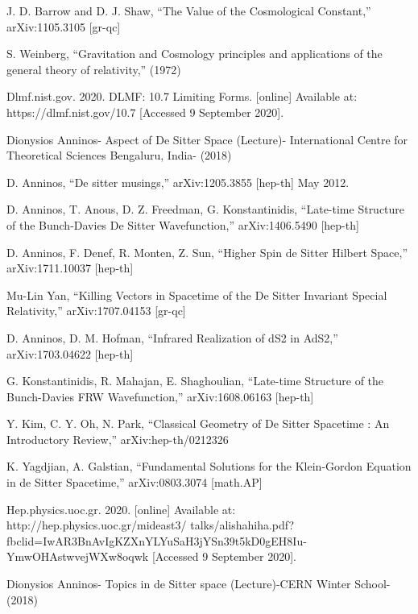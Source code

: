 \documentclass[a4paper,11pt]{article}
\numberwithin{equation}{section}
\numberwithin{figure}{section}
\begin{document}
\begin{large}
\begin{thebibliography}{}
    J. D. Barrow and D. J. Shaw, “The Value of the Cosmological Constant,” arXiv:1105.3105 [gr-qc]
    
    S. Weinberg, “Gravitation and Cosmology principles and applications of the general theory of relativity,” (1972)

    
    Dlmf.nist.gov. 2020. DLMF: 10.7 Limiting Forms. [online] Available at: https://dlmf.nist.gov/10.7 [Accessed 9 September 2020].
    
    Dionysios Anninos- Aspect of De Sitter Space (Lecture)- 
    International Centre for Theoretical Sciences Bengaluru, India- (2018)
    
    D. Anninos, “De sitter musings,” 	arXiv:1205.3855 [hep-th] May 2012.
    
    D. Anninos, T. Anous, D. Z. Freedman, G. Konstantinidis, “Late-time Structure of the Bunch-Davies De Sitter Wavefunction,” arXiv:1406.5490 [hep-th]
    
    D. Anninos, F. Denef, R. Monten, Z. Sun, “Higher Spin de Sitter Hilbert Space,” arXiv:1711.10037 [hep-th]
    
    Mu-Lin Yan, “Killing Vectors in Spacetime of the De Sitter Invariant Special Relativity,” arXiv:1707.04153 [gr-qc]
    
    D. Anninos, D. M. Hofman, “Infrared Realization of dS2 in AdS2,” 	arXiv:1703.04622 [hep-th]
    
    G. Konstantinidis, R. Mahajan, E. Shaghoulian, “Late-time Structure of the Bunch-Davies FRW Wavefunction,” arXiv:1608.06163 [hep-th]
    
    Y. Kim, C. Y. Oh, N. Park, “Classical Geometry of De Sitter Spacetime : An Introductory Review,” 	arXiv:hep-th/0212326
    
    K. Yagdjian, A. Galstian, “Fundamental Solutions for the Klein-Gordon Equation in de Sitter Spacetime,” 	arXiv:0803.3074 [math.AP]
    
    Hep.physics.uoc.gr. 2020. [online] Available at: http://hep.physics.uoc.gr/mideast3/
    talks/alishahiha.pdf?fbclid=IwAR3BnAvIgKZXnYLYuSaH3jYSn39t5kD0gEH8Iu-YmwOHAstwvejWXw8oqwk [Accessed 9 September 2020].
    
    Dionysios Anninos- Topics in de Sitter space (Lecture)-CERN Winter School- (2018)
    
\end{thebibliography}




\end{large}
\end{document}
